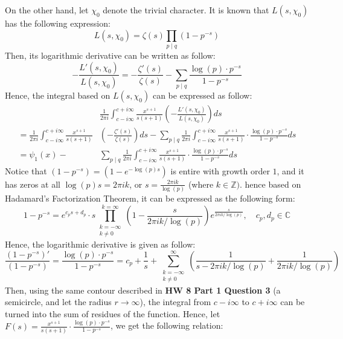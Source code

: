 \documentclass{article}
\newcommand{\ZZ}{\mathbb{Z}}
\newcommand{\CC}{\mathbb{C}}
\begin{document}
On the other hand, let $\chi_0$ denote the trivial character. It is known that $L(s,\chi_0)$ has the following expression:
\begin{equation}
    \label{eq:19}
    L(s,\chi_0)= \zeta(s)\prod_{p\mid q}(1-p^{-s})
\end{equation}
Then, its logarithmic derivative can be written as follow:
\begin{equation}
    \label{eq:20}
    -\frac{L'(s,\chi_0)}{L(s,\chi_0)}=-\frac{\zeta'(s)}{\zeta(s)}-\sum_{p\mid q}\frac{\log(p)\cdot p^{-s}}{1-p^{-s}}
\end{equation}
Hence, the integral based on $L(s,\chi_0)$ can be expressed as follow:
\begin{equation}
    \label{eq:21}
    \begin{split}
        &\frac{1}{2\pi i}\int_{c-i\infty}^{c+i\infty}\frac{x^{s+1}}{s(s+1)}\left(-\frac{L'(s,\chi_0)}{L(s,\chi_0)}\right)ds\\ 
        = \frac{1}{2\pi i}\int_{c-i\infty}^{c+i\infty}\frac{x^{s+1}}{s(s+1)}&\left(-\frac{\zeta'(s)}{\zeta(s)}\right)ds -\sum_{p\mid q}\frac{1}{2\pi i}\int_{c-i\infty}^{c+i\infty}\frac{x^{s+1}}{s(s+1)}\cdot \frac{\log(p)\cdot p^{-s}}{1-p^{-s}}ds\\
        = \psi_1(x)-&\sum_{p\mid q}\frac{1}{2\pi i}\int_{c-i\infty}^{c+i\infty}\frac{x^{s+1}}{s(s+1)}\cdot \frac{\log(p)\cdot p^{-s}}{1-p^{-s}}ds
    \end{split}
\end{equation}
Notice that $(1-p^{-s})= (1-e^{-\log(p)s})$ is entire with growth order $1$, and it has zeros at all $\log(p)s = 2\pi ik$, or $s = \frac{2\pi ik}{\log(p)}$ (where $k\in\ZZ)$. hence based on Hadamard's Factorization Theorem, it can be expressed as the following form:
\begin{equation}
    \label{eq:22}
    1-p^{-s}=e^{c_ps+d_p}\cdot s\prod_{\substack{k=-\infty\\k\neq 0}}^{k=\infty}\left(1-\frac{s}{2\pi ik/\log(p)}\right)e^{\frac{s}{2\pi ik/\log(p)}},\quad c_p,d_p\in \CC
\end{equation}
Hence, the logarithmic derivative is given as follow:
\begin{equation}
    \label{eq:23}
    \frac{(1-p^{-s})'}{(1-p^{-s})}=\frac{\log(p)\cdot p^{-s}}{1-p^{-s}} = c_p+\frac{1}{s}+\sum_{\substack{k=-\infty\\k\neq 0}}^{\infty}\left(\frac{1}{s-2\pi ik/\log(p)}+\frac{1}{2\pi ik/\log(p)}\right)
\end{equation}
Then, using the same contour described in \textbf{HW 8 Part 1 Question 3} (a semicircle, and let the radius $r\rightarrow\infty$), the integral from $c-i\infty$ to $c+i\infty$ can be turned into the sum of residues of the function. Hence, let $F(s)=\frac{x^{s+1}}{s(s+1)}\cdot\frac{\log(p)\cdot p^{-s}}{1-p^{-s}}$, we get the following relation:
\end{document}
